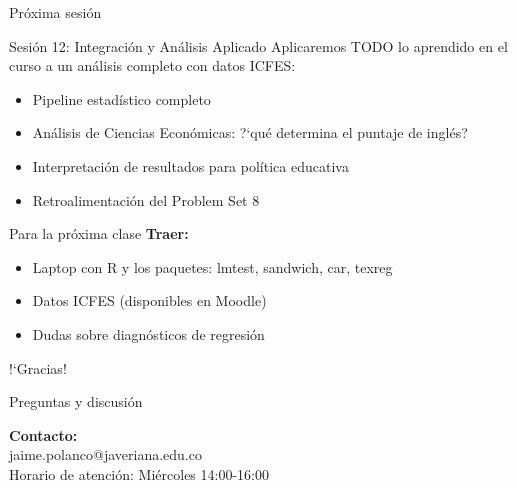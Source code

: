 \documentclass[aspectratio=169, 11pt]{beamer}
\begin{document}
\begin{frame}{Pr\'oxima sesi\'on}
\begin{block}{Sesi\'on 12: Integraci\'on y An\'alisis Aplicado}
Aplicaremos TODO lo aprendido en el curso a un an\'alisis completo con datos ICFES:
\begin{itemize}
\item Pipeline estad\'istico completo
\item An\'alisis de Ciencias Econ\'omicas: ?`qu\'e determina el puntaje de ingl\'es?
\item Interpretaci\'on de resultados para pol\'itica educativa
\item Retroalimentaci\'on del Problem Set 8
\end{itemize}
\end{block}

\begin{alertblock}{Para la pr\'oxima clase}
\textbf{Traer:}
\begin{itemize}
\item Laptop con R y los paquetes: lmtest, sandwich, car, texreg
\item Datos ICFES (disponibles en Moodle)
\item Dudas sobre diagn\'osticos de regresi\'on
\end{itemize}
\end{alertblock}
\end{frame}

\begin{frame}{}
\begin{center}
\Huge !`Gracias!

\vspace{0.8cm}
\Large Preguntas y discusi\'on

\vspace{1cm}
\normalsize
\textbf{Contacto:}\\
jaime.polanco@javeriana.edu.co\\
Horario de atenci\'on: Mi\'ercoles 14:00-16:00
\end{center}
\end{frame}
\end{document}
